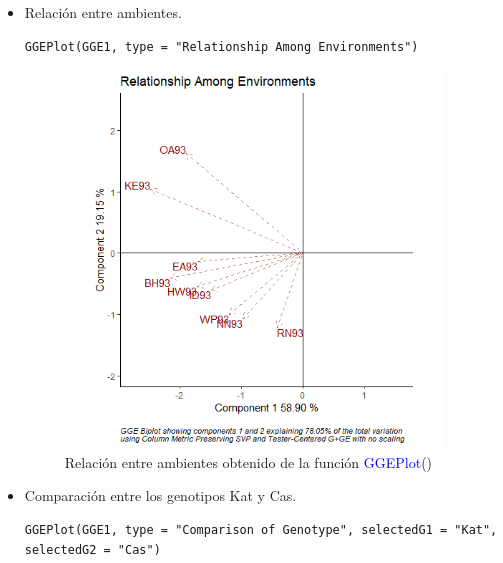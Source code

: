 \begin{itemize}
\item Relación entre ambientes.

\begin{lstlisting}
GGEPlot(GGE1, type = "Relationship Among Environments")
\end{lstlisting}

\begin{figure}[H]
	\begin{center}
		\includegraphics[width=10cm]{./Graficos/RelationshipAmongEnvironments.png}
	\end{center}
	\caption{Relación entre ambientes obtenido de la función \textcolor{blue}{GGEPlot}()}
\end{figure}

\item Comparación entre los genotipos Kat y Cas.

\begin{lstlisting}
GGEPlot(GGE1, type = "Comparison of Genotype", selectedG1 = "Kat", selectedG2 = "Cas")
\end{lstlisting}


\end{itemize}
